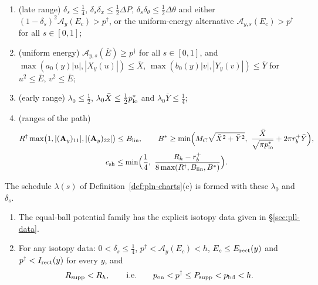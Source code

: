 \begin{definition}
\begin{enumerate}[label=(D\arabic*)]
\item\label{it:pln-D4} (late range) $\delta_s\le\frac14$, $\delta_s\delta_x\le\frac12\Delta P$, $\delta_s\delta_\theta\le\frac12\Delta\theta$ and
 either $(1-\delta_s)^2\mathcal A_y(E_c)>p^\dagger$, or the
 uniform-energy alternative $\mathcal A_{y,s}(E_c)>p^\dagger$ for all $s\in[0,1]$;
\item\label{it:pln-D5} (uniform energy) $\mathcal A_{y,s}(\bar E)\ge p^\dagger$ for all $s\in[0,1]$, and
 $\max(a_0(y)|u|,|X_y(u)|)\le\bar X$, $\max(b_0(y)|v|,|Y_y(v)|)\le\bar Y$ for $u^2\le\bar E$, $v^2\le\bar E$;
\item\label{it:pln-D6} (early range) $\lambda_0\le\frac12$, $\lambda_0\bar X\le\frac12p^*_{\rm lo}$ and $\lambda_0\bar Y\le\frac14$;
\item\label{it:pln-D7} (ranges of the path)
 \begin{gather*}
  R^\dagger\max\bigl(1,|(\mathbf A_y)_{11}|,|(\mathbf A_y)_{22}|\bigr)\le B_{\rm lin},\qquad
  B^*\ge\min\Bigl(M_C\sqrt{\bar X^2+\bar Y^2},\ \frac{\bar X}{\sqrt{\pi p^*_{\rm lo}}}+2\pi r_b^+\bar Y\Bigr),\\
  c_{\rm sh}\le\min\Bigl(\frac14,\ \frac{R_h-r_b^+}{8\max(R^\dagger,B_{\rm lin},B^*)}\Bigr).
 \end{gather*}
\end{enumerate}
The schedule $\lambda(s)$ of Definition~\ref{def:pln-charts}(c) is formed with these $\lambda_0$ and $\delta_s$.
\end{definition}

\begin{lemma}\label{lem:pln-data}
\begin{enumerate}[label=(\alph*)]
\item The equal-ball potential family has the explicit isotopy data given in
\S\ref{sec:pll-data}.
\item For any isotopy data: $0<\delta_s\le\frac14$, $p^\dagger<\mathcal A_y(E_c)<h$,
 $E_c\le E_{\rm rect}(y)$ and $p^\dagger<I_{\rm rect}(y)$ for every $y$, and
 \[
  R_{\rm supp}<R_h,\qquad\text{i.e.}\qquad p_{\rm on}<p^\dagger\le P_{\rm supp}<p_{\rm bd}<h .
 \]
\end{enumerate}
\end{lemma}

